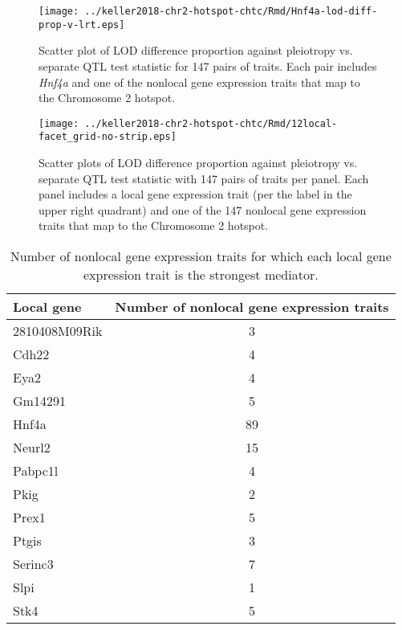 \documentclass[oneside]{book}
\begin{document}
\begin{figure}
    \centering
    \texttt{[image: ../keller2018-chr2-hotspot-chtc/Rmd/Hnf4a-lod-diff-prop-v-lrt.eps]}
    \caption[LOD difference proportion vs. pleiotropy test statistic.]{Scatter plot of LOD difference proportion against pleiotropy vs. separate QTL test statistic for 147 pairs of traits. Each pair includes \emph{Hnf4a} and one of the nonlocal gene expression traits that map to the Chromosome 2 hotspot.}
    \label{fig:hnf4a}
\end{figure}

\begin{figure}
    \centering
    \texttt{[image: ../keller2018-chr2-hotspot-chtc/Rmd/12local-facet\_grid-no-strip.eps]}
    \caption[LOD difference proportion vs. pleiotropy test statistic from the per-local gene perspective.]{Scatter plots of LOD difference proportion against pleiotropy vs. separate QTL test statistic with 147 pairs of traits per panel. Each panel includes a local gene expression trait (per the label in the upper right quadrant) and one of the 147 nonlocal gene expression traits that map to the Chromosome 2 hotspot.}
    \label{fig:nothnf4a-12}
\end{figure}






\begin{table}[ht]
\centering
\begin{tabular}{lc}
  \hline
 Local gene & Number of nonlocal gene expression traits \\
  \hline
2810408M09Rik &   3 \\
  Cdh22 &   4 \\
  Eya2 &   4 \\
  Gm14291 &   5 \\
  Hnf4a &  89 \\
  Neurl2 &  15 \\
  Pabpc1l &   4 \\
  Pkig &   2 \\
  Prex1 &   5 \\
  Ptgis &   3 \\
  Serinc3 &   7 \\
  Slpi &   1 \\
  Stk4 &   5 \\
   \hline
\end{tabular}
\caption{Number of nonlocal gene expression traits for which each local gene expression trait is the strongest mediator.}
\label{tab:med-count}
\end{table}
\end{document}
